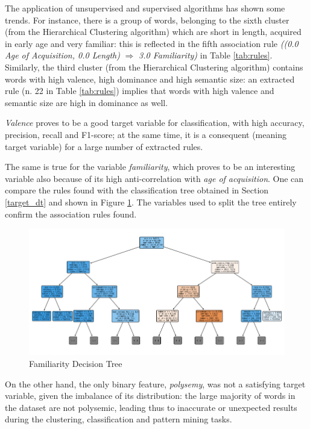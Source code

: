 \documentclass[a4paper,11pt,dvipsnames]{article}
\begin{document}
The application of unsupervised and supervised algorithms has shown some trends. For instance, there is a group of words, belonging to the sixth cluster (from the Hierarchical Clustering algorithm) which are short in length, acquired in early age and very familiar: this is reflected in the fifth association rule \textit{((0.0 Age of Acquisition, 0.0 Length)} $\Rightarrow$ \textit{3.0 Familiarity)}
in Table \ref{tab:rules}. Similarly, the third cluster (from the Hierarchical Clustering algorithm) contains words with high valence, high dominance and high semantic size: an extracted rule (n. 22 in Table \ref{tab:rules}) implies that words with high valence and semantic size are high in dominance as well. 

\textit{Valence} proves to be a good target variable for classification, with high accuracy, precision, recall and F1-score; at the same time, it is a consequent (meaning target variable) for a large number of extracted rules. 

The same is true for the variable \textit{familiarity}, which proves to be an interesting variable also because of its high anti-correlation with \textit{age of acquisition}. One can compare the rules found with the classification tree obtained in Section \ref{target_dt} and shown in Figure \ref{fig:tree_fam}. The variables used to split the tree entirely confirm the association rules found.

\begin{figure}[h]
    \centering
    \includegraphics[width=\textwidth]{fam_tree_entropy.png}
    \caption{Familiarity Decision Tree}
    \label{fig:tree_fam}
\end{figure}

On the other hand, the only binary feature, \textit{polysemy}, was not a satisfying target variable, given the imbalance of its distribution: the large majority of words in the dataset are not polysemic, leading thus to inaccurate or unexpected results during the clustering, classification and pattern mining tasks.



\newpage
\nocite{*}
\printbibliography
\end{document}
